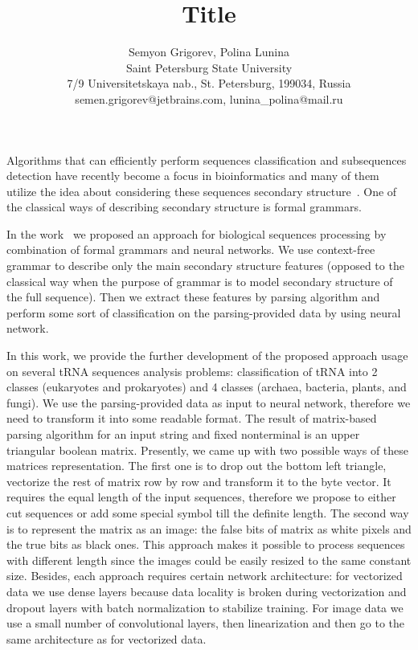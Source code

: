 \documentclass[12pt]{article}  %
\title{Title}
\author{Semyon Grigorev, Polina Lunina
\\
       {Saint Petersburg State University}\\
       {7/9 Universitetskaya nab., St. Petersburg, 199034, Russia}\\
       semen.grigorev@jetbrains.com, lunina\_polina@mail.ru
       }
\date{}
\theoremstyle{definition}
\theoremstyle{remark}
\begin{document}
\maketitle
Algorithms that can efficiently perform sequences classification and subsequences detection have recently become a focus in bioinformatics and many of them utilize the idea about considering these sequences secondary structure~\cite{GrammarsRNA, PCFG, meta, LWPCFG}. One of the classical ways of describing secondary structure is formal grammars.

In the work~\cite{grigorevcomposition} we proposed an approach for biological sequences processing by combination of formal grammars and neural networks. We use context-free grammar to describe only the main secondary structure features (opposed to the classical way when the purpose of grammar is to model secondary structure of the full sequence). Then we extract these features by parsing algorithm and perform some sort of classification on the parsing-provided data by using neural network. 

In this work, we provide the further development of the proposed approach usage on several tRNA sequences analysis problems: classification of tRNA into 2 classes (eukaryotes and prokaryotes) and 4 classes (archaea, bacteria, plants, and fungi). We use the parsing-provided data as input to neural network, therefore we need to transform it into some readable format. The result of matrix-based parsing algorithm for an input string and fixed nonterminal is an upper triangular boolean matrix. Presently, we came up with two possible ways of these matrices representation. The first one is to drop out the bottom left triangle, vectorize the rest of matrix row by row and transform it to the byte vector. It requires the equal length of the input sequences, therefore we propose to either cut sequences or add some special symbol till the definite length. The second way is to represent the matrix as an image: the false bits of matrix as white pixels and the true bits as black ones. This approach makes it possible to process sequences with different length since the images could be easily resized to the same constant size. Besides, each approach requires certain network architecture: for vectorized data we use dense layers because data locality is broken during vectorization and dropout layers with batch normalization to stabilize training. For image data we use a small number of convolutional layers, then linearization and then go to the same architecture as for vectorized data.
\end{document}
